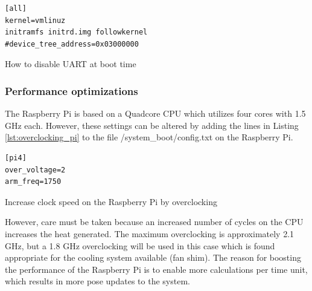 \documentclass[../Head/report.tex]{subfiles}
\begin{document}
\begin{listing}[H] 
\begin{tcolorbox}[
    enhanced,
    attach boxed title to top left={xshift=6mm,yshift=-3mm},
    colback=lightgreen!20,
    colframe=lightgreen,
    fonttitle=\bfseries\color{black},
]
\begin{verbatim}
[all]
kernel=vmlinuz
initramfs initrd.img followkernel
#device_tree_address=0x03000000
\end{verbatim}
\end{tcolorbox}
\caption{How to disable UART at boot time}
\label{lst:disable_uart_at_boot_time}    
\end{listing} 

\subsubsection{Performance optimizations}
\label{sec:performance optimizations_pi}

The Raspberry Pi is based on a Quadcore CPU which utilizes four cores with 1.5 GHz each. However, these settings can be altered by adding the lines in Listing \ref{lst:overclocking_pi} to the file /system\_boot/config.txt on the Raspberry Pi.  

\begin{listing}[H] 
\begin{tcolorbox}[
    enhanced,
    attach boxed title to top left={xshift=6mm,yshift=-3mm},
    colback=lightgreen!20,
    colframe=lightgreen,
    fonttitle=\bfseries\color{black},
]
\begin{verbatim}
[pi4]
over_voltage=2
arm_freq=1750
\end{verbatim}
\end{tcolorbox}
\caption{Increase clock speed on the Raspberry Pi by overclocking}
\label{lst:overclocking_pi}    
\end{listing} 

However, care must be taken because an increased number of cycles on the CPU increases the heat generated. The maximum overclocking is approximately 2.1 GHz, but a 1.8 GHz overclocking will be used in this case which is found appropriate for the cooling system available (fan shim). The reason for boosting the performance of the Raspberry Pi is to enable more calculations per time unit, which results in more pose updates to the system. 
\end{document}
